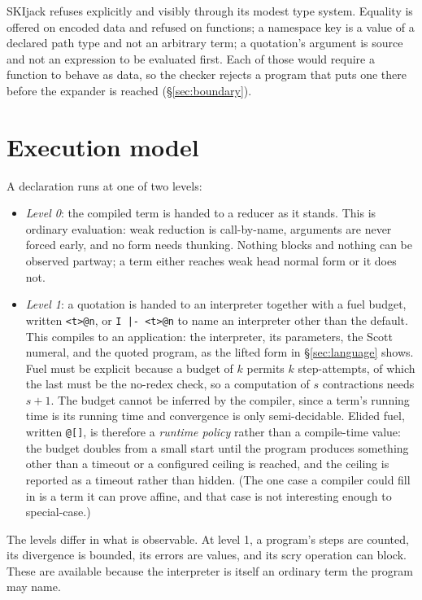 \documentclass[english,submission,code=tt]{programming}
\begin{document}
SKIjack refuses explicitly and visibly through its modest type system.  
Equality is offered on encoded data and refused on functions; a 
namespace key is a value of a declared path type and not an arbitrary 
term; a quotation's argument is source and not an expression to be 
evaluated first.  Each of those would require a function to behave as 
data, so the checker rejects a program that puts one there before the 
expander is reached (\S\ref{sec:boundary}).

\section{Execution model}\label{sec:execution-model}

A declaration runs at one of two levels:
\begin{itemize}[nosep]
  \item  \emph{Level 0}: the compiled term is handed to a reducer as it 
  stands.  This is ordinary evaluation: weak reduction is call-by-name, 
  arguments are never forced early, and no form needs thunking.  
  Nothing blocks and nothing can be observed partway; a term either 
  reaches weak head normal form or it does not.
  \item  \emph{Level 1}: a quotation is handed to an interpreter 
  together with a fuel budget, written \texttt{<t>@n}, or \texttt{I |- 
  <t>@n} to name an interpreter other than the default.  This compiles 
  to an application: the interpreter, its parameters, the Scott 
  numeral, and the quoted program, as the lifted form in
  \S\ref{sec:language} shows.  Fuel must be explicit because a budget 
  of $k$ permits $k$ step-attempts, of which the last must be the 
  no-redex check, so a computation of $s$ contractions needs $s+1$. The 
  budget cannot be inferred by the compiler, since a term's running 
  time is its running time and convergence is only semi-decidable.  
  Elided fuel, written \texttt{@[]}, is therefore a \emph{runtime 
  policy} rather than a compile-time value: the budget doubles from a 
  small start until the program produces something other than a timeout 
  or a configured ceiling is reached, and the ceiling is reported as a 
  timeout rather than hidden. (The one case a compiler could fill in is 
  a term it can prove affine, and that case is not interesting enough 
  to special-case.)
\end{itemize}
The levels differ in what is observable.  At level 1, a program's steps
are counted, its divergence is bounded, its errors are values, and its
scry operation can block.  These are available because the
interpreter is itself an ordinary term the program may name.
\end{document}
